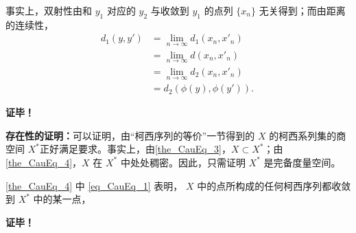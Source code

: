 事实上，双射性由和 $y_1$ 对应的 $y_2$ 与收敛到 $y_1$ 的点列 $\{x_n\}$ 无关得到；而由距离的连续性，
\begin{equation}
\begin{aligned}
d_1(y,y')&=\lim_{n\rightarrow\infty} d_1(x_n,x'_n)\\
&=\lim_{n\rightarrow\infty} d(x_n,x'_n)\\
&=\lim_{n\rightarrow\infty} d_2(x_n,x'_n)\\
&=d_2(\phi(y),\phi(y')).
\end{aligned}~
\end{equation}

\textbf{证毕！}

\textbf{存在性的证明：}可以证明，由“柯西序列的等价”一节得到的 $X$ 的柯西系列集的商空间 $X^*$正好满足要求。事实上，由\autoref{the_CauEq_3}，$X\subset X^*$；由\autoref{the_CauEq_4}，$X$ 在 $X^*$ 中处处稠密。因此，只需证明 $X^*$ 是完备度量空间。

\autoref{the_CauEq_4} 中 \autoref{eq_CauEq_1} 表明， $X$ 中的点所构成的任何柯西序列都收敛到 $X^*$ 中的某一点，




\textbf{证毕！}
